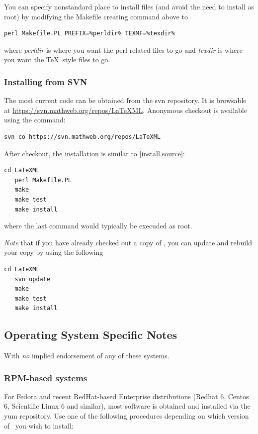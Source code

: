 \documentclass{article}
\begin{document}
You can specify nonstandard place to install files (and avoid the need to install as root)
by modifying the Makefile creating command above to
\begin{lstlisting}[style=shell]
   perl Makefile.PL PREFIX=%perldir% TEXMF=%texdir%
\end{lstlisting}
where \emph{perldir} is where you want the perl related files to go and
\emph{texdir} is where you want the \TeX\ style files to go.

\subsubsection{Installing from SVN}\label{install.svn}
The most current code can be obtained from the svn repository.
It is browsable at \url{https://svn.mathweb.org/repos/LaTeXML}.
Anonymous checkout is available using the command:
\begin{lstlisting}[style=shell]
  svn co https://svn.mathweb.org/repos/LaTeXML
\end{lstlisting}
After checkout, the installation is similar to \ref{install.source}:
\begin{lstlisting}[style=shell]
   cd LaTeXML
   perl Makefile.PL
   make
   make test
   make install
\end{lstlisting}
where the last command would typically be execuded as root.

\emph{Note} that if you have already checked out a copy of \LaTeXML, you can update
and rebuild your copy by using the following
\begin{lstlisting}[style=shell]
   cd LaTeXML
   svn update
   make
   make test
   make install
\end{lstlisting}

\subsection[OS-Specific Notes]{Operating System Specific Notes}\label{install.osnotes}
With \emph{no} implied endorsement of any of these systems.

\subsubsection[RPM-based systems]{RPM-based systems}\label{install.fedora}
For Fedora and recent RedHat-based Enterprise distributions
(Redhat 6, Centos 6, Scientific Linux 6 and similar),
most software is obtained and installed via the yum repository.
Use one of the following procedures depending on which version
of \LaTeXML\ you wish to install:
\end{document}
